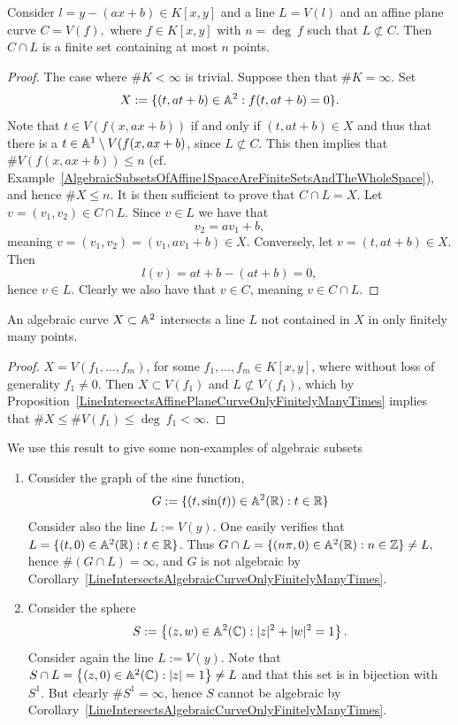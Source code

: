 \begin{proposition}\label{LineIntersectsAffinePlaneCurveOnlyFinitelyManyTimes}
    Consider $l = y-(ax+b)\in K[x,y]$ and a line $L=V(l)$ and an affine plane curve $C =V(f),$ where $f\in K[x,y]$ with $n=\deg\ f$ such that $L\not\subset C$. Then $C\cap L$ is a finite set containing at most $n$ points.
\end{proposition}
\begin{proof}
    The case where $\#K < \infty$ is trivial. Suppose then that $\#K = \infty$.
    Set
    $$X := \{(t,at+b)\in \mathbb{A}^2 : f(t,at+b)=0\}.$$
    Note that $t \in V(f(x,ax+b))$ if and only if $(t,at+b)\in X$ and thus that there is a $t \in \mathbb{A}^1\setminus V(f(x,ax+b)$, since $L\not\subset C$. This then implies that  $\#V(f(x,ax+b))\leq n$ (cf. Example~\ref{AlgebraicSubsetsOfAffine1SpaceAreFiniteSetsAndTheWholeSpace}), and hence $\#X \leq n$. It is then sufficient to prove that $C\cap L = X$. Let $v=(v_1,v_2)\in C\cap L$. Since $v\in L$ we have that 
    $$v_2 = av_1+b,$$
    meaning $v=(v_1,v_2)=(v_1,av_1+b)\in X$. Conversely, let $v=(t,at+b)\in X$. Then 
    $$l(v) = at+b-(at+b) = 0,$$
    hence $v\in L$. Clearly we also have that $v\in C$, meaning $v\in C\cap L$.
\end{proof}
\begin{corollary}\label{LineIntersectsAlgebraicCurveOnlyFinitelyManyTimes}
    An algebraic curve $X\subset \mathbb{A}^2$ intersects a line $L$ not contained in $X$ in only finitely many points.
\end{corollary}
\begin{proof}
    $X=V(f_1,\dots,f_m)$, for some $f_1,\dots,f_m\in K[x,y]$, where without loss of generality $f_1\neq 0$. Then $X\subset V(f_1)$ and $L \not\subset V(f_1)$, which by Proposition~\ref{LineIntersectsAffinePlaneCurveOnlyFinitelyManyTimes} implies that $\#X\leq \#V(f_1)\leq \deg\ f_1 <\infty$.
\end{proof}
We use this result to give some non-examples of algebraic subsets
\begin{example}
    \begin{enumerate}
        \item Consider the graph of the sine function,
        $$G := \{(t,\sin(t))\in \mathbb{A}^2(\mathbb{R}) : t\in \mathbb{R} \}$$
        Consider also the line $L:=V(y)$. One easily verifies that $L=\{(t,0)\in \mathbb{A}^2(\mathbb{R}) : t\in \mathbb{R}\}$. Thus $G\cap L = \{ (n\pi,0)\in \mathbb{A}^2(\mathbb{R}) : n\in \mathbb{Z}\} \neq L,$ hence $\#(G\cap L) = \infty$, and $G$ is not algebraic by Corollary~\ref{LineIntersectsAlgebraicCurveOnlyFinitelyManyTimes}.
        \item Consider the sphere
        $$S:=\left\{(z,w)\in \mathbb{A}^2(\mathbb{C}) : \vert z \vert^2+\vert w \vert^2 = 1 \right\}.$$
        Consider again the line $L:=V(y)$. Note that $S\cap L  = \left\{ (z,0) \in \mathbb{A}^2(\mathbb{C}) : \vert z\vert = 1 \right\} \neq L$ and that this set is in bijection with $S^1$. But clearly $\#S^1=\infty$, hence $S$ cannot be algebraic by Corollary~\ref{LineIntersectsAlgebraicCurveOnlyFinitelyManyTimes}.
    \end{enumerate}
\end{example}
